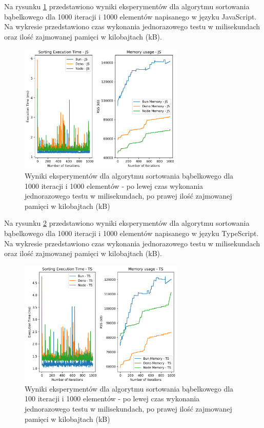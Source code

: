 Na rysunku \ref{fig:bubble_sorting_e3} przedstawiono wyniki eksperymentów dla algorytmu sortowania bąbelkowego dla 1000 iteracji i 1000 elementów napisanego w języku JavaScript. Na wykresie przedstawiono czas wykonania jednorazowego testu w milisekundach oraz ilość zajmowanej pamięci w kilobajtach (kB).

\begin{figure}[H]
  \centering
  \includegraphics[width=0.7\textwidth]{Figures/sorting/sorting_bubble_1000_1000_js.png}
  \caption{Wyniki eksperymentów dla algorytmu sortowania bąbelkowego dla 1000 iteracji i 1000 elementów - po lewej czas wykonania jednorazowego testu w milisekundach, po prawej ilość zajmowanej pamięci w kilobajtach (kB)}
  \label{fig:bubble_sorting_e3}
\end{figure}

Na rysunku \ref{fig:bubble_sorting_e3_ts} przedstawiono wyniki eksperymentów dla algorytmu sortowania bąbelkowego dla 1000 iteracji i 1000 elementów napisanego w języku TypeScript. Na wykresie przedstawiono czas wykonania jednorazowego testu w milisekundach oraz ilość zajmowanej pamięci w kilobajtach (kB).

\begin{figure}[H]
  \centering
  \includegraphics[width=0.7\textwidth]{Figures/sorting/sorting_bubble_1000_1000_ts.png}
  \caption{Wyniki eksperymentów dla algorytmu sortowania bąbelkowego dla 100 iteracji i 1000 elementów - po lewej czas wykonania jednorazowego testu w milisekundach, po prawej ilość zajmowanej pamięci w kilobajtach (kB)}
  \label{fig:bubble_sorting_e3_ts}
\end{figure}

